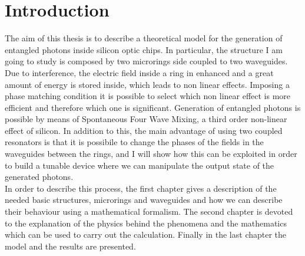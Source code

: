 \chapter{Introduction}
The aim of this thesis is to describe a theoretical model for the generation of entangled photons inside silicon optic chips. In particular, the structure I am going to study is composed by two microrings side coupled to two waveguides. Due to interference, the electric field inside a ring in enhanced and a great amount of energy is stored inside, which leads to non linear effects. Imposing a phase matching condition it is possible to select which non linear effect is more efficient and therefore which one is significant. Generation of entangled photons is possible by means of Spontaneous Four Wave Mixing, a third order non-linear effect of silicon.
In addition to this, the main advantage of using two coupled resonators is that it is possibile to change the phases of the fields in the waveguides between the rings, and I will show how this can be exploited in order to build a tunable device where we can manipulate the output state of the generated photons.
\\
In order to describe this process, the first chapter gives a description of the needed basic structures, microrings and waveguides and how we can describe their behaviour using a mathematical formalism. The second chapter is devoted to the explanation of the physics behind the phenomena and the mathematics which can be used to carry out the calculation. Finally in the last chapter the model and the results are presented.
